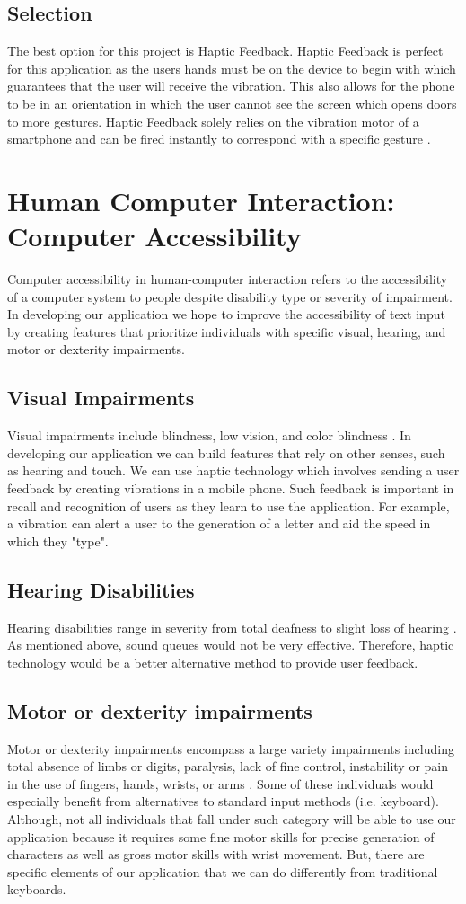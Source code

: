\documentclass[onecolumn, draftclsnofoot,10pt, journal, letterpaper]{IEEEtran}
\begin{document}
    \subsection{Selection}
        The best option for this project is Haptic Feedback. Haptic Feedback is perfect for this application as the users hands must be on the device to begin with which guarantees that the user will receive the vibration. This also allows for the phone to be in an orientation in which the user cannot see the screen which opens doors to more gestures. Haptic Feedback solely relies on the vibration motor of a smartphone and can be fired instantly to correspond with a specific gesture \cite{AZOM}.
        
\section{Human Computer Interaction: Computer Accessibility}
    Computer accessibility in human-computer interaction refers to the accessibility of a computer system to people despite disability type or severity of impairment. In developing our application we hope to improve the accessibility of text input by creating features that prioritize individuals with specific visual, hearing, and motor or dexterity impairments.
    \subsection{Visual Impairments}
        Visual impairments include blindness, low vision, and color blindness \cite{ics}. In developing our application we can build features that rely on other senses, such as hearing and touch. We can use haptic technology which involves sending a user feedback by creating vibrations in a mobile phone. Such feedback is important in recall and recognition of users as they learn to use the application. For example, a vibration can alert a user to the generation of a letter and aid the speed in which they "type".  
    \subsection{Hearing Disabilities}
        Hearing disabilities range in severity from total deafness to slight loss of hearing \cite{ics}. As mentioned above, sound queues would not be very effective. Therefore, haptic technology would be a better alternative method to provide user feedback.
    \subsection{Motor or dexterity impairments}
        Motor or dexterity impairments encompass a large variety impairments including total absence of limbs or digits, paralysis, lack of fine control, instability or pain in the use of fingers, hands, wrists, or arms \cite{ics}. Some of these individuals would especially benefit from alternatives to standard input methods (i.e. keyboard). Although, not all individuals that fall under such category will be able to use our application because it requires some fine motor skills for precise generation of characters as well as gross motor skills with wrist movement. But, there are specific elements of our application that we can do differently from traditional keyboards. 
\end{document}
